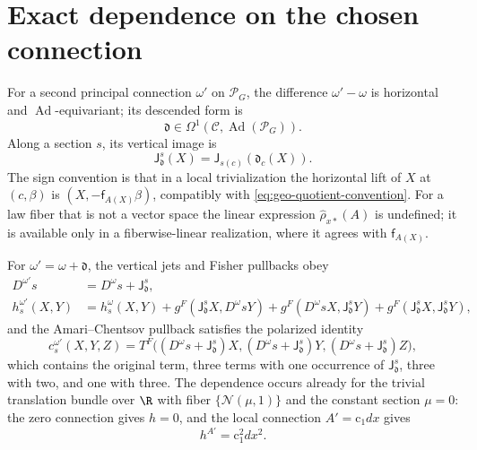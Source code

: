 \section{Exact dependence on the chosen connection}
\label{sec:pb-connection-dependence}

For a second principal connection \(\omega'\) on \(\mathscr P_G\), the difference \(\omega'-\omega\)
is horizontal and \(\operatorname{Ad}\)-equivariant; its descended form is
\begin{equation}
\mathfrak d\in\Omega^1(\mathcal C,\operatorname{Ad}(\mathscr P_G)).
\label{eq:pb-connection-difference}
\end{equation}
Along a section \(s\), its vertical image is
\begin{equation}
\mathsf J^s_{\mathfrak d}(X)=\mathsf J_{s(c)}(\mathfrak d_c(X)).
\label{eq:pb-connection-difference-vertical}
\end{equation}
The sign convention is that in a local trivialization the horizontal lift of \(X\) at \((c,\beta)\) is
\((X,-\mathsf f_{A(X)}\beta)\), compatibly with \eqref{eq:geo-quotient-convention}. For a law fiber that
is not a vector space the linear expression \(\widehat\rho_{x*}(A)\) is undefined; it is available only
in a fiberwise-linear realization, where it agrees with \(\mathsf f_{A(X)}\).

For \(\omega'=\omega+\mathfrak d\), the vertical jets and Fisher pullbacks obey
\begin{align}
D^{\omega'}s
&=D^\omega s+\mathsf J^s_{\mathfrak d},
\label{eq:pb-jet-connection-change}\\
h_s^{\omega'}(X,Y)
&=h_s^\omega(X,Y)
+g^F(\mathsf J^s_{\mathfrak d}X,D^\omega sY)
+g^F(D^\omega sX,\mathsf J^s_{\mathfrak d}Y)
+g^F(\mathsf J^s_{\mathfrak d}X,\mathsf J^s_{\mathfrak d}Y),
\label{eq:pb-fisher-connection-change}
\end{align}
and the Amari--Chentsov pullback satisfies the polarized identity
\begin{equation}
c_s^{\omega'}(X,Y,Z)
=T^F\bigl((D^\omega s+\mathsf J^s_{\mathfrak d})X,
(D^\omega s+\mathsf J^s_{\mathfrak d})Y,
(D^\omega s+\mathsf J^s_{\mathfrak d})Z\bigr),
\label{eq:pb-amari-connection-change}
\end{equation}
which contains the original term, three terms with one occurrence of \(\mathsf J^s_{\mathfrak d}\),
three with two, and one with three. The dependence occurs already for the trivial translation bundle
over \(\R\) with fiber \(\{\mathcal N(\mu,1)\}\) and the constant section \(\mu=0\): the zero
connection gives \(h=0\), and the local connection \(A'=\mathrm c_1dx\) gives
\begin{equation}
h^{A'}=\mathrm c_1^2dx^2.
\label{eq:pb-connection-dependence-example}
\end{equation}

